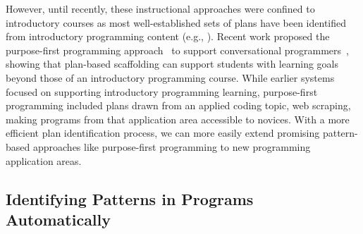 However, until recently, these instructional approaches were confined to introductory courses as most well-established sets of plans have been identified from introductory programming content (e.g., \cite{Iyer_PatternCensus_SIGCSE-2021, wallingford1998elementary, izu_inventory_2021}). Recent work proposed the purpose-first programming approach~\cite{Cunningham_PurposeFirstProgramming_CHI-2021} to support conversational programmers~\cite{Chilana_RiseConversationalProgrammer_VLHCC-2015, conversational-programmers-industry_Chilana_CHI-2016}, showing that plan-based scaffolding can support students with learning goals beyond those of an introductory programming course. While earlier systems focused on supporting introductory programming learning, purpose-first programming included plans drawn from an applied coding topic, web scraping, making programs from that application area accessible to novices. With a more efficient plan identification process, we can more easily extend promising pattern-based approaches like purpose-first programming to new programming application areas. 




\subsection{Identifying Patterns in Programs Automatically}


